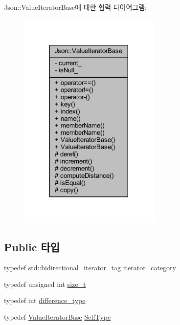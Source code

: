 Json\+:\+:Value\+Iterator\+Base에 대한 협력 다이어그램\+:\nopagebreak
\begin{figure}[H]
\begin{center}
\leavevmode
\includegraphics[width=200pt]{class_json_1_1_value_iterator_base__coll__graph}
\end{center}
\end{figure}
\subsection*{Public 타입}
\begin{DoxyCompactItemize}
\item 
typedef std\+::bidirectional\+\_\+iterator\+\_\+tag \hyperlink{class_json_1_1_value_iterator_base_a02fd11a4fbdc0007da1e8bcf5e6b83c3}{iterator\+\_\+category}
\item 
typedef unsigned int \hyperlink{class_json_1_1_value_iterator_base_a9d3a3c7ce5cdefe23cb486239cf07bb5}{size\+\_\+t}
\item 
typedef int \hyperlink{class_json_1_1_value_iterator_base_a4e44bf8cbd17ec8d6e2c185904a15ebd}{difference\+\_\+type}
\item 
typedef \hyperlink{class_json_1_1_value_iterator_base}{Value\+Iterator\+Base} \hyperlink{class_json_1_1_value_iterator_base_a9d2a940d03ea06d20d972f41a89149ee}{Self\+Type}
\end{DoxyCompactItemize}
